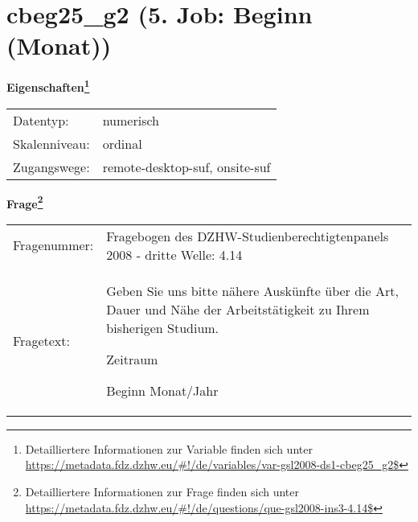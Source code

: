 
    \setcounter{footnote}{0}

    \vspace*{-1.8cm}
	\section{cbeg25\_g2 (5. Job: Beginn (Monat))}
	\label{section:cbeg25_g2}



    \vspace*{0.5cm}
    \noindent\textbf{Eigenschaften\footnote{Detailliertere Informationen zur Variable finden sich unter
		\url{https://metadata.fdz.dzhw.eu/\#!/de/variables/var-gsl2008-ds1-cbeg25_g2$}}}\\
	\begin{tabularx}{\hsize}{@{}lX}
	Datentyp: & numerisch \\
	Skalenniveau: & ordinal \\
	Zugangswege: &
	  remote-desktop-suf, 
	  onsite-suf
 \\
    \end{tabularx}



				\vspace*{0.5cm}
                \noindent\textbf{Frage\footnote{Detailliertere Informationen zur Frage finden sich unter
		              \url{https://metadata.fdz.dzhw.eu/\#!/de/questions/que-gsl2008-ins3-4.14$}}}\\
				\begin{tabularx}{\hsize}{@{}lX}
					Fragenummer: &
					  Fragebogen des DZHW-Studienberechtigtenpanels 2008 - dritte Welle:
					  4.14
 \\
					Fragetext: & Geben Sie uns bitte nähere Auskünfte über die Art, Dauer und Nähe der Arbeitstätigkeit zu Ihrem bisherigen Studium.\par  Zeitraum\par  Beginn Monat/Jahr \\
				\end{tabularx}





